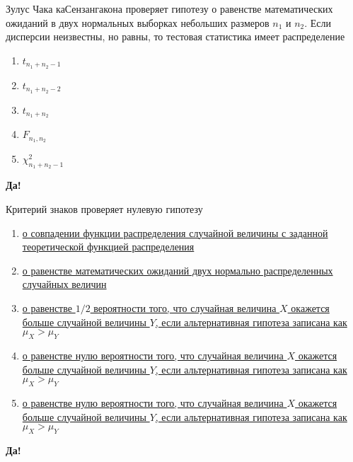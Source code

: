 \documentclass[t]{beamer}
\begin{document}
 \begin{frame} \label{25-Yes} 
\begin{block}{25} 

Зулус Чака каСензангакона проверяет гипотезу  о равенстве математических ожиданий в двух нормальных выборках небольших размеров $n_1$   и  $n_2$. Если дисперсии неизвестны, но равны, то тестовая статистика имеет распределение
 


 \end{block} 
\begin{enumerate} 
\item[] \hyperlink{25-No}{\beamergotobutton{} $t_{n_1+n_2-1}$}
\item[] \hyperlink{25-Yes}{\beamergotobutton{} $t_{n_1+n_2-2}$}
\item[] \hyperlink{25-No}{\beamergotobutton{} $t_{n_1+n_2}$}
\item[] \hyperlink{25-No}{\beamergotobutton{} $F_{n_1,n_2}$}
\item[] \hyperlink{25-No}{\beamergotobutton{} $\chi^2_{n_1+n_2-1}$}
\end{enumerate} 

 \textbf{Да!} 
 \hyperlink{26}{}\end{frame} 


 \begin{frame} \label{26-Yes} 
\begin{block}{26} 

Критерий знаков проверяет нулевую гипотезу
 


 \end{block} 
\begin{enumerate} 
\item[] \hyperlink{26-No}{\beamergotobutton{} о совпадении функции распределения случайной величины с заданной теоретической функцией распределения}
\item[] \hyperlink{26-No}{\beamergotobutton{} о равенстве математических ожиданий двух нормально распределенных случайных величин}
\item[] \hyperlink{26-No}{\beamergotobutton{} о равенстве $1/2$ вероятности того, что случайная величина $X$ окажется больше случайной величины $Y$, если альтернативная гипотеза записана как $\mu_X>\mu_Y$}
\item[] \hyperlink{26-No}{\beamergotobutton{} о равенстве нулю вероятности того, что случайная величина $X$ окажется больше случайной величины $Y$, если альтернативная гипотеза записана как $\mu_X>\mu_Y$ }
\item[] \hyperlink{26-Yes}{\beamergotobutton{} о равенстве нулю вероятности того, что случайная величина $X$ окажется больше случайной величины $Y$, если альтернативная гипотеза записана как $\mu_X>\mu_Y$}
\end{enumerate} 

 \textbf{Да!} 
 \hyperlink{27}{}\end{frame} 
\end{document}
